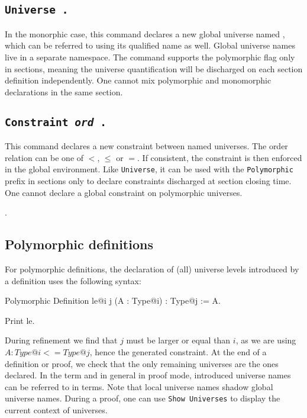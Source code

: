 \subsection{\tt Universe {\ident}.
  \label{UniverseCmd}}

In the monorphic case, this command declares a new global universe named
{\ident}, which can be referred to using its qualified name as
well. Global universe names live in a separate namespace. The command
supports the polymorphic flag only in sections, meaning the universe
quantification will be discharged on each section definition
independently. One cannot mix polymorphic and monomorphic declarations
in the same section.

\subsection{\tt Constraint {\ident} {\textit{ord}} {\ident}.
  \label{ConstraintCmd}}

This command declares a new constraint between named universes.
The order relation can be one of $<$, $\le$ or $=$. If consistent, 
the constraint is then enforced in the global environment. Like
\texttt{Universe}, it can be used with the \texttt{Polymorphic} prefix
in sections only to declare constraints discharged at section closing time.
One cannot declare a global constraint on polymorphic universes.

\begin{ErrMsgs}
\item {}.
\item {}
\end{ErrMsgs}

\subsection{Polymorphic definitions}
For polymorphic definitions, the declaration of (all) universe levels
introduced by a definition uses the following syntax:

\begin{coq_example*}
Polymorphic Definition le@{i j} (A : Type@{i}) : Type@{j} := A.
\end{coq_example*}
\begin{coq_example}
Print le.
\end{coq_example}

During refinement we find that $j$ must be larger or equal than $i$, as
we are using $A : Type@{i} <= Type@{j}$, hence the generated
constraint. At the end of a definition or proof, we check that the only
remaining universes are the ones declared. In the term and in general in
proof mode, introduced universe names can be referred to in
terms. Note that local universe names shadow global universe names.
During a proof, one can use \texttt{Show Universes} to display
the current context of universes.

